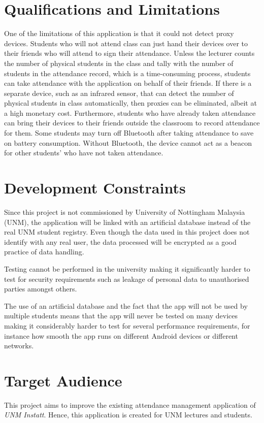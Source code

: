 \documentclass[../report.tex]{subfiles}
\begin{document}
\section{Qualifications and Limitations}
One of the limitations of this application is that it could not detect proxy devices. Students who will not attend class can just hand their devices over to their friends who will attend to sign their attendance. Unless the lecturer counts the number of physical students in the class and tally with the number of students in the attendance record, which is a time-consuming process, students can take attendance with the application on behalf of their friends. If there is a separate device, such as an infrared sensor, that can detect the number of physical students in class automatically, then proxies can be eliminated, albeit at a high monetary cost. Furthermore, students who have already taken attendance can bring their devices to their friends outside the classroom to record attendance for them. Some students may turn off Bluetooth after taking attendance to save on battery consumption. Without Bluetooth, the device cannot act as a beacon for other students’ who have not taken attendance.

\section{Development Constraints}
Since this project is not commissioned by University of Nottingham Malaysia (UNM), the application will be linked with an artificial database instead of the real UNM student registry. Even though the data used in this project does not identify with any real user, the data processed will be encrypted as a good practice of data handling.

Testing cannot be performed in the university making it significantly harder to test for security requirements such as leakage of personal data to unauthorised parties amongst others. 

The use of an artificial database and the fact that the app will not be used by multiple students means that the app will never be tested on many devices making it considerably harder to test for several performance requirements, for instance how smooth the app runs on different Android devices or different networks.

\section{Target Audience}
This project aims to improve the existing attendance management application of \textit{UNM Instatt}. Hence, this application is created for UNM lectures and students.
\end{document}
